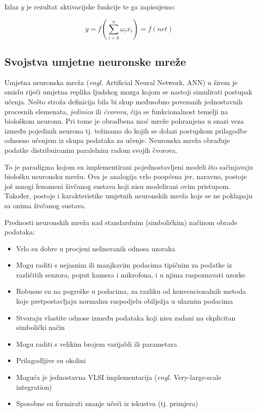Izlaz $y$ je rezultat aktivacijske funkcije te ga zapisujemo:

\begin{equation}
y = f(\sum_{i=0}^{n} \omega_i x_i) = f(net)
\label{eq:activation-function}
\end{equation}


\subsection{Svojstva umjetne neuronske mreže}

Umjetna neuronska mreža (\textit{engl.} Artificial Neural Network, ANN) u širem je smislu riječi umjetna replika ljudskog mozga kojom se nastoji simulirati postupak učenja. Nešto stroža definicija bila bi skup međusobno povezanih jednostavnih procesnih elemenata, \textit{jedinica} ili \textit{čvorova}, čija se funkcionalnost temelji na biološkom neuronu. Pri tome je obradbena moć mreže pohranjena u snazi veza između pojedinih neurona tj. težinama do kojih se dolazi postupkom prilagodbe odnosno učenjem iz skupa podataka za učenje. Neuronska mreža obrađuje podatke distribuiranim paralelnim radom svojih čvorova.

To je paradigma kojom su implementirani pojednostavljeni modeli što sačinjavaju biološku neuronsku mrežu. Ova je analogija vrlo poopćena jer, naravno, postoje još mnogi fenomeni živčanog sustava koji nisu modelirani ovim pristupom. Također, postoje i karakteristike umjetnih neuronskih mreža koje se ne poklapaju sa onima živčanog sustava.

Prednosti neuronskih mreža nad standardnim (simboličkim) načinom obrade podataka:

\begin{itemize}
\item Vrlo su dobre u procjeni nelineranih odnosa uzoraka
\item Mogu raditi s nejasnim ili manjkavim podacima tipičnim za podatke iz različitih senzora, poput kamera i mikrofona, i u njima raspoznavati uzorke
\item Robusne su na pogreške u podacima, za razliku od konvencionalnih metoda koje pretpostavljaju normalnu raspodjelu obilježja u ulaznim podacima
\item Stvaraju vlastite odnose između podataka koji nisu zadani na ekplicitan simbolički način
\item Mogu raditi s velikim brojem varijabli ili parametara
\item Prilagodljive su okolini
\item Moguća je jednostavna VLSI implementacija (\textit{engl.} Very-large-scale integration)
\item Sposobne su formirati znanje učeći iz iskustva (tj. primjera)
\end{itemize}

